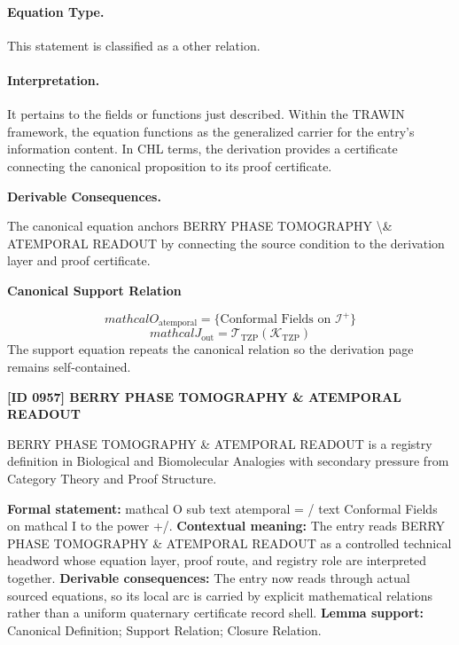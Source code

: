 \paragraph{Equation Type.}
This statement is classified as a other relation.

\paragraph{Interpretation.}
It pertains to the fields or functions just described. Within the TRAWIN framework, the equation functions as the generalized carrier for the entry’s information content. In CHL terms, the derivation provides a certificate connecting the canonical proposition to its proof certificate.

\par\vspace{0.35em}
\noindent\textbf{Derivable Consequences.}\quad
\begingroup
\footnotesize
\raggedright
The canonical equation anchors BERRY PHASE TOMOGRAPHY \textbackslash{}\& ATEMPORAL READOUT by connecting the source condition to the derivation layer and proof certificate.
\par\endgroup

\noindent\textbf{Canonical Support Relation}\par
\[
mathcal{O}_{\text{atemporal}} = \{\text{Conformal Fields on } \mathcal{I}^+\}
\]
\[
mathcal{J}_{\mathrm{out}} = \mathcal{T}_{\mathrm{TZP}}\!\left(\mathcal{K}_{\mathrm{TZP}}\right)
\]
\noindent The support equation repeats the canonical relation so the derivation page remains self-contained.\par

\clearpage
\noindent\textbf{[ID 0957] BERRY PHASE TOMOGRAPHY \& ATEMPORAL READOUT}\par
\vspace{0.35em}
\begingroup\small
{}
BERRY PHASE TOMOGRAPHY \& ATEMPORAL READOUT is a registry definition in Biological and Biomolecular Analogies with secondary pressure from Category Theory and Proof Structure.

\begingroup\footnotesize\setlength{\emergencystretch}{3em}\sloppy
\textbf{Formal statement:} mathcal O sub text atemporal = / text Conformal Fields on mathcal I to the power +/. \textbf{Contextual meaning:} The entry reads BERRY PHASE TOMOGRAPHY \& ATEMPORAL READOUT as a controlled technical headword whose equation layer, proof route, and registry role are interpreted together. \textbf{Derivable consequences:} The entry now reads through actual sourced equations, so its local arc is carried by explicit mathematical relations rather than a uniform quaternary certificate record shell. \textbf{Lemma support:} Canonical Definition; Support Relation; Closure Relation.\par
\endgroup

